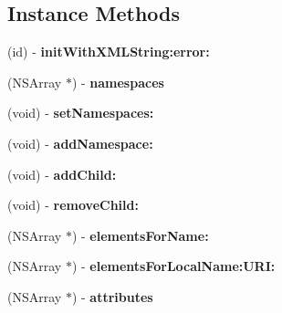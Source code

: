 \subsection*{Instance Methods}
\begin{DoxyCompactItemize}
\item 
\hypertarget{interface_g_data_x_m_l_element_a8020a4dae6ad3175527534d5a793e285}{(id) -\/ {\bfseries init\+With\+X\+M\+L\+String\+:error\+:}}\label{interface_g_data_x_m_l_element_a8020a4dae6ad3175527534d5a793e285}

\item 
\hypertarget{interface_g_data_x_m_l_element_a4c0f13082cdf1115dd51a1199a6c8935}{(N\+S\+Array $\ast$) -\/ {\bfseries namespaces}}\label{interface_g_data_x_m_l_element_a4c0f13082cdf1115dd51a1199a6c8935}

\item 
\hypertarget{interface_g_data_x_m_l_element_af725206ae3ce5c7855a1a2960e82fef7}{(void) -\/ {\bfseries set\+Namespaces\+:}}\label{interface_g_data_x_m_l_element_af725206ae3ce5c7855a1a2960e82fef7}

\item 
\hypertarget{interface_g_data_x_m_l_element_a58f2f9b4dbc512caa8b0a6ac42e907a1}{(void) -\/ {\bfseries add\+Namespace\+:}}\label{interface_g_data_x_m_l_element_a58f2f9b4dbc512caa8b0a6ac42e907a1}

\item 
\hypertarget{interface_g_data_x_m_l_element_a506a65646d411876d1d23b1ce0afa920}{(void) -\/ {\bfseries add\+Child\+:}}\label{interface_g_data_x_m_l_element_a506a65646d411876d1d23b1ce0afa920}

\item 
\hypertarget{interface_g_data_x_m_l_element_a8d9571efd0923ecc365b267fd1c95c8a}{(void) -\/ {\bfseries remove\+Child\+:}}\label{interface_g_data_x_m_l_element_a8d9571efd0923ecc365b267fd1c95c8a}

\item 
\hypertarget{interface_g_data_x_m_l_element_af0724908d7e1c6b831caddcaf7973aaa}{(N\+S\+Array $\ast$) -\/ {\bfseries elements\+For\+Name\+:}}\label{interface_g_data_x_m_l_element_af0724908d7e1c6b831caddcaf7973aaa}

\item 
\hypertarget{interface_g_data_x_m_l_element_af2cb81abe782d2d3396fe9abe3b9f60e}{(N\+S\+Array $\ast$) -\/ {\bfseries elements\+For\+Local\+Name\+:\+U\+R\+I\+:}}\label{interface_g_data_x_m_l_element_af2cb81abe782d2d3396fe9abe3b9f60e}

\item 
\hypertarget{interface_g_data_x_m_l_element_ae6e3e03eff00c20c2953fcbe88d3c4d5}{(N\+S\+Array $\ast$) -\/ {\bfseries attributes}}\label{interface_g_data_x_m_l_element_ae6e3e03eff00c20c2953fcbe88d3c4d5}


\end{DoxyCompactItemize}

